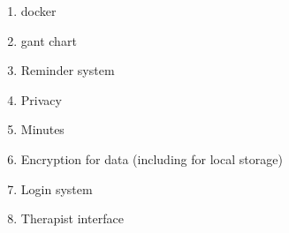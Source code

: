 \documentclass[11pt]{article}
\begin{document}
    \begin{enumerate}
        \item docker
        \item gant chart
        \item Reminder system
        \item Privacy
        \item Minutes
        \item Encryption for data (including for local storage)
        \item Login system
        \item Therapist interface
    \end{enumerate}
\end{document}
